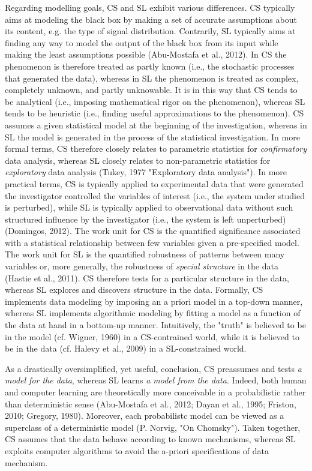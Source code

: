 \documentclass[authoryear,review,3p]{elsarticle}
\begin{document}
Regarding modelling goals, CS and SL exhibit various differences.
CS typically aims at modeling the black box by making a set of
accurate assumptions about its content,
e.g. the type of signal distribution.
Contrarily, SL typically aims at finding any way to model
the output of the black box from its input
while making the least assumptions possible (Abu-Mostafa et al., 2012).
In CS the phenomenon is therefore treated as partly known
(i.e., the stochastic processes that generated the data),
whereas in SL the phenomenon is treated as complex,
completely unknown, and partly unknowable.
It is in this way that CS tends to be
analytical
(i.e., imposing mathematical rigor on the phenomenon),
whereas SL tends to be
heuristic
(i.e., finding useful approximations to the phenomenon).
CS assumes a given statistical model at the beginning of the investigation,
whereas in SL the model is
generated in the process of the statistical investigation.
In more formal terms,
CS therefore closely relates to parametric statistics
for \textit{confirmatory} data analysis,
whereas SL closely relates to non-parametric statistics
for \textit{exploratory} data analysis
(Tukey, 1977 "Exploratory data analysis").
In more practical terms, CS is typically applied to experimental data
that were generated
the investigator controlled the variables of interest 
(i.e., the system under studied is perturbed),
while SL is typically applied to observational
data without such structured influence by the investigator
(i.e., the system is left unperturbed) (Domingos, 2012).
The work unit for CS is the quantified
significance associated with a statistical
relationship between few variables given a pre-specified model.
The work unit for SL is the quantified robustness of patterns
between many variables or, more generally,
the robustness of \textit{special structure} in the data (Hastie et al., 2011).
CS therefore tests for a particular structure in the data,
whereas SL explores and discovers structure in the data.
Formally, CS implements data modeling by
imposing an a priori model in a top-down manner,
whereas SL implements algorithmic modeling by fitting
a model as a function of the data at hand in a bottom-up manner.
%
Intuitively, the "truth" is believed
to be in the model (cf. Wigner, 1960) in a CS-contrained world,
while it is believed to be in the data
(cf. Halevy et al., 2009) in a SL-constrained world.


As a drastically oversimplified, yet useful, conclusion,
CS preassumes and tests \textit{a model for the data},
whereas SL learns \textit{a model from the data}.
%
Indeed,
both human and computer learning are theoretically
more conceivable in a probabilistic rather than
deterministic sense
(Abu-Mostafa et al., 2012; Dayan et al., 1995; Friston, 2010; Gregory, 1980).
Moreover, each probabilistc model can be viewed as a superclass
of a deterministic model (P. Norvig, "On Chomsky").
%
Taken together,
CS assumes that the data behave according to known mechanisms,
whereas SL exploits
computer algorithms to avoid the a-priori
specifications of data mechanism.
\end{document}
